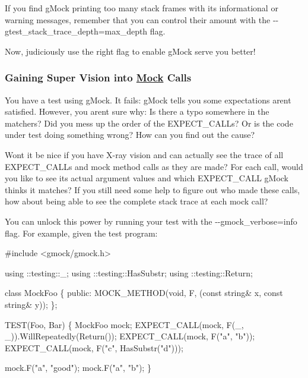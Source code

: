 If you find g\+Mock printing too many stack frames with its informational or warning messages, remember that you can control their amount with the {\ttfamily -\/-\/gtest\+\_\+stack\+\_\+trace\+\_\+depth=max\+\_\+depth} flag.

Now, judiciously use the right flag to enable g\+Mock serve you better!

\subsubsection*{Gaining Super Vision into \mbox{\hyperlink{classMock}{Mock}} Calls}

You have a test using g\+Mock. It fails\+: g\+Mock tells you some expectations aren\textquotesingle{}t satisfied. However, you aren\textquotesingle{}t sure why\+: Is there a typo somewhere in the matchers? Did you mess up the order of the {\ttfamily E\+X\+P\+E\+C\+T\+\_\+\+C\+A\+LL}s? Or is the code under test doing something wrong? How can you find out the cause?

Won\textquotesingle{}t it be nice if you have X-\/ray vision and can actually see the trace of all {\ttfamily E\+X\+P\+E\+C\+T\+\_\+\+C\+A\+LL}s and mock method calls as they are made? For each call, would you like to see its actual argument values and which {\ttfamily E\+X\+P\+E\+C\+T\+\_\+\+C\+A\+LL} g\+Mock thinks it matches? If you still need some help to figure out who made these calls, how about being able to see the complete stack trace at each mock call?

You can unlock this power by running your test with the {\ttfamily -\/-\/gmock\+\_\+verbose=info} flag. For example, given the test program\+:


\begin{DoxyCode}
\textcolor{preprocessor}{#include <gmock/gmock.h>}

using ::testing::\_;
using ::testing::HasSubstr;
using ::testing::Return;

\textcolor{keyword}{class }MockFoo \{
 \textcolor{keyword}{public}:
  MOCK\_METHOD(\textcolor{keywordtype}{void}, F, (\textcolor{keyword}{const} \textcolor{keywordtype}{string}& x, \textcolor{keyword}{const} \textcolor{keywordtype}{string}& y));
\};

TEST(Foo, Bar) \{
  MockFoo mock;
  EXPECT\_CALL(mock, F(\_, \_)).WillRepeatedly(Return());
  EXPECT\_CALL(mock, F(\textcolor{stringliteral}{"a"}, \textcolor{stringliteral}{"b"}));
  EXPECT\_CALL(mock, F(\textcolor{stringliteral}{"c"}, HasSubstr(\textcolor{stringliteral}{"d"})));

  mock.F(\textcolor{stringliteral}{"a"}, \textcolor{stringliteral}{"good"});
  mock.F(\textcolor{stringliteral}{"a"}, \textcolor{stringliteral}{"b"});
\}
\end{DoxyCode}


